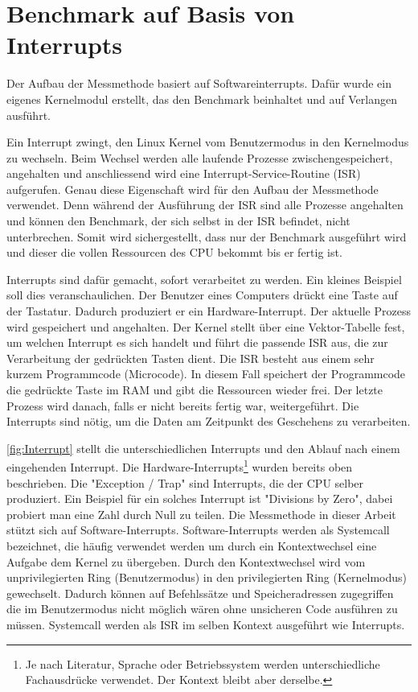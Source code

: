 
\section{Benchmark auf Basis von Interrupts}
\label{chap:benchmark_basis_interrupts}



Der Aufbau der Messmethode basiert auf Softwareinterrupts. Dafür wurde ein eigenes Kernelmodul erstellt, das den Benchmark beinhaltet und auf Verlangen ausführt.
\par
Ein Interrupt zwingt, den Linux Kernel vom Benutzermodus in den Kernelmodus zu wechseln\cite{Mandl2010_3}. Beim Wechsel werden alle laufende Prozesse zwischengespeichert, angehalten und anschliessend wird eine Interrupt-Service-Routine (ISR) aufgerufen. Genau diese Eigenschaft wird für den Aufbau der Messmethode verwendet. Denn während der Ausführung der ISR sind alle Prozesse angehalten und können den Benchmark, der sich selbst in der ISR befindet, nicht unterbrechen. Somit wird sichergestellt, dass nur der Benchmark ausgeführt wird und dieser die vollen Ressourcen des CPU bekommt bis er fertig ist.
\par
Interrupts sind dafür gemacht, sofort verarbeitet zu werden. Ein kleines Beispiel soll dies veranschaulichen. Der Benutzer eines Computers drückt eine Taste auf der Tastatur. Dadurch produziert er ein Hardware-Interrupt. Der aktuelle Prozess wird gespeichert und angehalten. Der Kernel stellt über eine Vektor-Tabelle fest, um welchen Interrupt es sich handelt und führt die passende ISR aus, die zur Verarbeitung der gedrückten Tasten dient. Die ISR besteht aus einem sehr kurzem Programmcode (Microcode). In diesem Fall speichert der Programmcode die gedrückte Taste im RAM und gibt die Ressourcen wieder frei. Der letzte Prozess wird danach, falls er nicht bereits fertig war, weitergeführt. Die Interrupts sind nötig, um die Daten am Zeitpunkt des Geschehens zu verarbeiten.
\par
\autoref{fig:Interrupt} stellt die unterschiedlichen Interrupts und den Ablauf nach einem eingehenden Interrupt. Die Hardware-Interrupts\footnote{Je nach Literatur, Sprache oder Betriebssystem werden unterschiedliche Fachausdrücke verwendet. Der Kontext bleibt aber derselbe.} wurden bereits oben beschrieben. Die "Exception / Trap" sind Interrupts, die der CPU selber produziert. Ein Beispiel für ein solches Interrupt ist "Divisions by Zero", dabei probiert man eine Zahl durch Null zu teilen. Die Messmethode in dieser Arbeit stützt sich auf Software-Interrupts. Software-Interrupts werden als Systemcall bezeichnet, die häufig verwendet werden um durch ein Kontextwechsel eine Aufgabe dem Kernel zu übergeben. Durch den Kontextwechsel wird vom unprivilegierten Ring  (Benutzermodus) in den privilegierten Ring (Kernelmodus) gewechselt. Dadurch können auf Befehlssätze und Speicheradressen zugegriffen die im Benutzermodus nicht möglich wären ohne unsicheren Code ausführen zu müssen. Systemcall werden als ISR im selben Kontext ausgeführt wie Interrupts.

